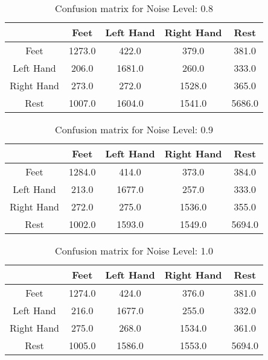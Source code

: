 \begin{table}[!htbp]
    \centering
    \begin{tabular}{|c||c|c|c|c|}
        \hline
		 & Feet & Left Hand & Right Hand & Rest \\
        \hline
        \hline
        Feet & 1273.0 & 422.0 & 379.0 & 381.0 \\
        \hline
        Left Hand & 206.0 & 1681.0 & 260.0 & 333.0 \\
        \hline
        Right Hand & 273.0 & 272.0 & 1528.0 & 365.0 \\
        \hline
        Rest & 1007.0 & 1604.0 & 1541.0 & 5686.0 \\
        \hline
    \end{tabular}
    \caption{Confusion matrix for Noise Level: 0.8}
\end{table}

\begin{table}[!htbp]
    \centering
    \begin{tabular}{|c||c|c|c|c|}
        \hline
		 & Feet & Left Hand & Right Hand & Rest \\
        \hline
        \hline
        Feet & 1284.0 & 414.0 & 373.0 & 384.0 \\
        \hline
        Left Hand & 213.0 & 1677.0 & 257.0 & 333.0 \\
        \hline
        Right Hand & 272.0 & 275.0 & 1536.0 & 355.0 \\
        \hline
        Rest & 1002.0 & 1593.0 & 1549.0 & 5694.0 \\
        \hline
    \end{tabular}
    \caption{Confusion matrix for Noise Level: 0.9}
\end{table}

\begin{table}[!htbp]
    \centering
    \begin{tabular}{|c||c|c|c|c|}
        \hline
		 & Feet & Left Hand & Right Hand & Rest \\
        \hline
        \hline
        Feet & 1274.0 & 424.0 & 376.0 & 381.0 \\
        \hline
        Left Hand & 216.0 & 1677.0 & 255.0 & 332.0 \\
        \hline
        Right Hand & 275.0 & 268.0 & 1534.0 & 361.0 \\
        \hline
        Rest & 1005.0 & 1586.0 & 1553.0 & 5694.0 \\
        \hline
    \end{tabular}
    \caption{Confusion matrix for Noise Level: 1.0}
\end{table}

